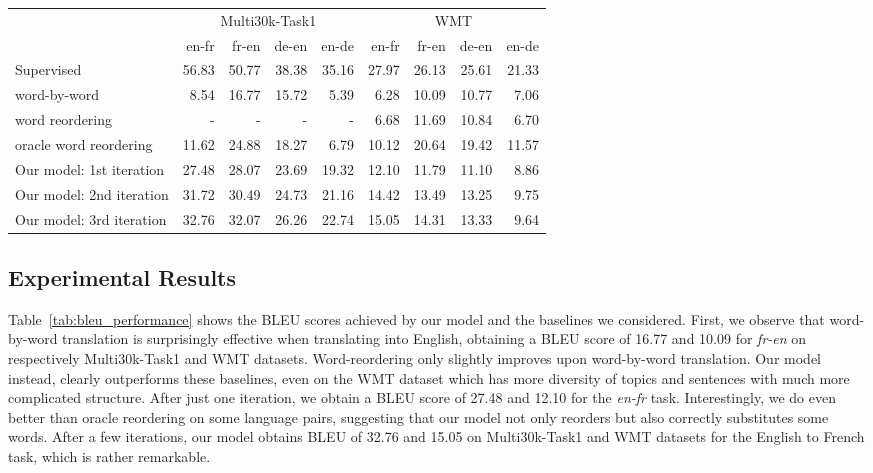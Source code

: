\documentclass{article} \usepackage{iclr2018_conference,times}
\begin{document}
\begin{table*}[t]
	\begin{center}
	\small
	\begin{tabular}[b]{lrrrr|rrrr}
	\toprule
    & \multicolumn{4}{c}{Multi30k-Task1} & \multicolumn{4}{c}{WMT}\\
    & en-fr & fr-en & de-en & en-de & en-fr & fr-en & de-en & en-de \\
    \midrule

    Supervised & 56.83 & 50.77 & 38.38 & 35.16 & 27.97 & 26.13 & 25.61 & 21.33 \\
    \midrule
	word-by-word                      &  8.54 & 16.77 & 15.72 &  5.39 &  6.28 & 10.09 & 10.77 &  7.06 \\
	word reordering      &   -   &   -   &   -   &   -   &   6.68 & 11.69  & 10.84  &  6.70  \\
	oracle word reordering  & 11.62  & 24.88  & 18.27  &  6.79  & 10.12  & 20.64  & 19.42  & 11.57  \\
	\midrule
    Our model: 1st iteration                      & 27.48 & 28.07 & 23.69 & 19.32 & 12.10 & 11.79 & 11.10 &  8.86 \\
    Our model: 2nd iteration                      & 31.72 & 30.49 & 24.73 & 21.16 & 14.42 & 13.49 & 13.25 &  9.75 \\
    Our model: 3rd iteration                      & 32.76 & 32.07 & 26.26 & 22.74 & 15.05 & 14.31 & 13.33 &  9.64 \\
    \bottomrule
	\end{tabular}
	\caption{\textbf{BLEU score on the Multi30k-Task1 and WMT datasets} using greedy decoding.}
	\label{tab:bleu_performance}
	\end{center}
\end{table*}

\subsection{Experimental Results} \label{sec:results}

Table~\ref{tab:bleu_performance} shows the BLEU scores achieved by our model and the baselines we considered. First, we observe that word-by-word translation is surprisingly effective when translating into English, obtaining a BLEU score of 16.77 and 10.09 for \textit{fr-en} on respectively Multi30k-Task1 and WMT datasets. Word-reordering only slightly improves upon word-by-word translation. Our model instead, clearly outperforms these baselines, even on the WMT dataset which has more diversity of topics and sentences with much more complicated structure. After just one iteration, we obtain a BLEU score of 27.48 and 12.10 for the \textit{en-fr} task. Interestingly, we do even better than oracle reordering on some language pairs, suggesting that our model not only reorders but also correctly substitutes some words. After a few iterations, our model obtains BLEU of 32.76 and 15.05 on Multi30k-Task1 and WMT datasets for the English to French task, which is rather remarkable.
\end{document}
